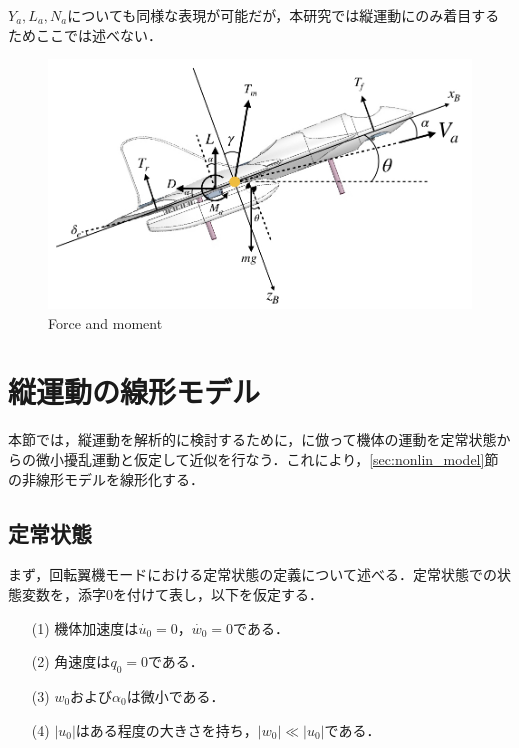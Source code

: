 $Y_a,L_a,N_a$についても同様な表現が可能だが，本研究では縦運動にのみ着目するためここでは述べない．


\begin{figure}[H]
	\centering
	\includegraphics[clip,width=15.0cm,bb=0 0 935 551]{./z_figure_files/chapter3/6_xz_force.jpeg}
	\caption{Force and moment}
	\label{fig:xz_force}
\end{figure}

\section{縦運動の線形モデル}
本節では，縦運動を解析的に検討するために，\cite{katou}に倣って機体の運動を定常状態からの微小擾乱運動と仮定して近似を行なう．これにより，\ref{sec:nonlin_model}節の非線形モデルを線形化する．

\subsection{定常状態}
\label{sec:steady}

まず，回転翼機モードにおける定常状態の定義について述べる．定常状態での状態変数を，添字0を付けて表し，以下を仮定する．
	\begin{itemize}
	\item[(1)]機体加速度は$\dot{u_0} = 0$，$\dot{w_0} = 0$である．
	\item[(2)]角速度は$q_0 = 0$である．
  \item[(3)]$w_0$および$\alpha_0$は微小である．
  \item[(4)]$|u_0|$はある程度の大きさを持ち，$|w_0|\ll|u_0|$である．
	\end{itemize}

